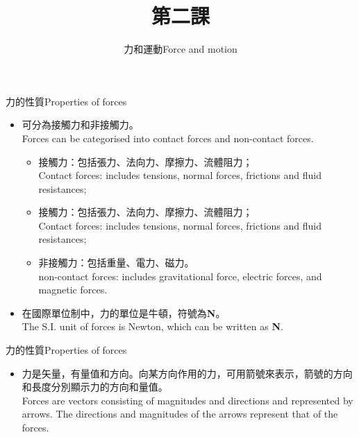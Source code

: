 \documentclass[beamer=true]{standalone}
\title{第二課}
\author{力和運動Force and motion}
\institute{全年班}
\date{}
\begin{document}
\frame{\titlepage}

\begin{frame}{力的性質Properties of forces}
    \begin{itemize}
        \item 可分為接觸力和非接觸力。\\Forces can be categorised into contact forces and non-contact forces.
              \begin{itemize}
                  \item 接觸力：包括張力、法向力、摩擦力、流體阻力；\\Contact forces: includes tensions, normal forces, frictions and fluid resistances;
                  \item 接觸力：包括張力、法向力、摩擦力、流體阻力；\\Contact forces: includes tensions, normal forces, frictions and fluid resistances;
                  \item 非接觸力：包括重量、電力、磁力。\\non-contact forces: includes gravitational force, electric forces, and magnetic forces.
              \end{itemize}
        \item 在國際單位制中，力的單位是牛頓，符號為\textbf{N}。\\The S.I. unit of forces is Newton, which can be written as \textbf{N}.

    \end{itemize}
\end{frame}

\begin{frame}{力的性質Properties of forces}
    \begin{itemize}
        \item 力是矢量，有量值和方向。向某方向作用的力，可用箭號來表示，箭號的方向和長度分別顯示力的方向和量值。 \\Forces are vectors consisting of magnitudes and directions and represented by arrows. The directions and magnitudes of the arrows represent that of the forces.
    \end{itemize}
\end{frame}
\end{document}
